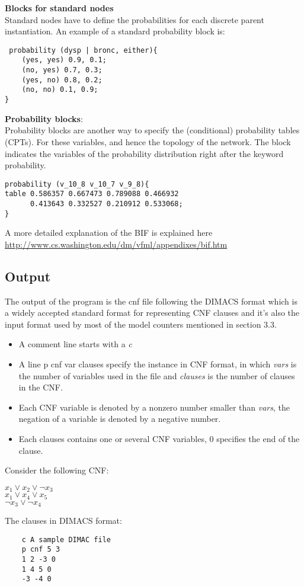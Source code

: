 \noindent \textbf{Blocks for standard nodes}\\
Standard nodes have to define the probabilities for each discrete parent instantiation. An example of a standard probability block is: 
\begin{lstlisting}
 probability (dysp | bronc, either){
    (yes, yes) 0.9, 0.1;
    (no, yes) 0.7, 0.3;
    (yes, no) 0.8, 0.2;
    (no, no) 0.1, 0.9;
}
\end{lstlisting}

\noindent \textbf{Probability blocks}:\\
Probability blocks are another way to specify the (conditional) probability tables (CPTs). For these variables, and hence the topology of the network. The block indicates the variables of the probability distribution right after the keyword probability.
\begin{lstlisting}
probability (v_10_8 v_10_7 v_9_8){ 
table 0.586357 0.667473 0.789088 0.466932 
      0.413643 0.332527 0.210912 0.533068;
}
\end{lstlisting}
A more detailed explanation of the BIF is explained here \url{http://www.cs.washington.edu/dm/vfml/appendixes/bif.htm}\\

\subsection{Output}
The output of the program is the cnf file following the DIMACS format which is a widely accepted standard format for representing CNF clauses and it's also the input format used by most of the model counters mentioned in section 3.3.\\
\begin{itemize}
    \item A comment line starts with a \textit{c}
    \item A line p cnf var clauses specify the instance in CNF format, in which \textit{vars} is the number of variables used in the file and \textit{clauses} is the number of clauses in the CNF.
    \item Each CNF variable is denoted by a non\-zero number smaller than \textit{vars}, the negation of a variable is denoted by a negative number.
    \item Each clauses contains one or several CNF variables, 0 specifies the end of the clause.
\end{itemize}

Consider the following CNF:
\begin{center}
    $x_{1} \vee x_{2} \vee \neg x_{3}$\\
    $x_{1} \vee x_{4} \vee x_{5}$\\
    $\neg x_{3} \vee \neg x_{4}$\\  
\end{center}
The clauses in DIMACS format:
\begin{center}
    \begin{lstlisting}
    c A sample DIMAC file
    p cnf 5 3
    1 2 -3 0
    1 4 5 0
    -3 -4 0
    \end{lstlisting}
\end{center}